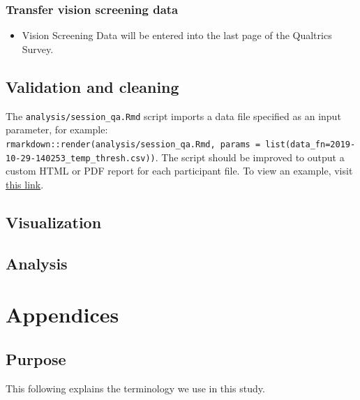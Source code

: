 \documentclass[]{article}
\providecommand{\tightlist}{%
  \setlength{\itemsep}{0pt}\setlength{\parskip}{0pt}}
\begin{document}
\hypertarget{transfer-vision-screening-data}{%
\subsubsection{Transfer vision screening
data}\label{transfer-vision-screening-data}}

\begin{itemize}
\tightlist
\item
  Vision Screening Data will be entered into the last page of the
  Qualtrics Survey.
\end{itemize}

\hypertarget{validation-and-cleaning}{%
\subsection{Validation and cleaning}\label{validation-and-cleaning}}

The \texttt{analysis/session\_qa.Rmd} script imports a data file
specified as an input parameter, for example:
\texttt{rmarkdown::render(\textquotesingle{}analysis/session\_qa.Rmd\textquotesingle{},\ params\ =\ list(data\_fn=\textquotesingle{}2019-10-29-140253\_temp\_thresh.csv\textquotesingle{}))}.
The script should be improved to output a custom HTML or PDF report for
each participant file. To view an example, visit
\href{https://gilmore-lab.github.io/sex-differences-in-motion-perception/analysis/session_qa.html}{this
link}.

\hypertarget{visualization}{%
\subsection{Visualization}\label{visualization}}

\hypertarget{analysis}{%
\subsection{Analysis}\label{analysis}}

\hypertarget{appendices}{%
\section{Appendices}\label{appendices}}

\hypertarget{purpose-1}{%
\subsection{Purpose}\label{purpose-1}}

This following explains the terminology we use in this study.
\end{document}
